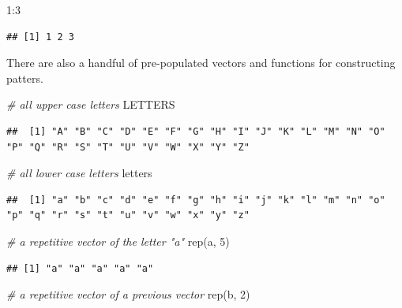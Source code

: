 \documentclass[
]{book}
\newenvironment{Shaded}{\begin{snugshade}}{\end{snugshade}}
\newcommand{\CommentTok}[1]{\textcolor[rgb]{0.56,0.35,0.01}{\textit{#1}}}
\newcommand{\DecValTok}[1]{\textcolor[rgb]{0.00,0.00,0.81}{#1}}
\newcommand{\FunctionTok}[1]{\textcolor[rgb]{0.00,0.00,0.00}{#1}}
\newcommand{\NormalTok}[1]{#1}
\newcommand{\SpecialCharTok}[1]{\textcolor[rgb]{0.00,0.00,0.00}{#1}}
\newcommand{\StringTok}[1]{\textcolor[rgb]{0.31,0.60,0.02}{#1}}
\begin{document}
\begin{Shaded}
\begin{Highlighting}[]
\DecValTok{1}\SpecialCharTok{:}\DecValTok{3}
\end{Highlighting}
\end{Shaded}

\begin{verbatim}
## [1] 1 2 3
\end{verbatim}

There are also a handful of pre-populated vectors and functions for constructing patters.

\begin{Shaded}
\begin{Highlighting}[]
\CommentTok{\# all upper case letters}
\NormalTok{LETTERS}
\end{Highlighting}
\end{Shaded}

\begin{verbatim}
##  [1] "A" "B" "C" "D" "E" "F" "G" "H" "I" "J" "K" "L" "M" "N" "O" "P" "Q" "R" "S" "T" "U" "V" "W" "X" "Y" "Z"
\end{verbatim}

\begin{Shaded}
\begin{Highlighting}[]
\CommentTok{\# all lower case letters}
\NormalTok{letters}
\end{Highlighting}
\end{Shaded}

\begin{verbatim}
##  [1] "a" "b" "c" "d" "e" "f" "g" "h" "i" "j" "k" "l" "m" "n" "o" "p" "q" "r" "s" "t" "u" "v" "w" "x" "y" "z"
\end{verbatim}

\begin{Shaded}
\begin{Highlighting}[]
\CommentTok{\# a repetitive vector of the letter "a"}
\FunctionTok{rep}\NormalTok{(}\StringTok{\textquotesingle{}a\textquotesingle{}}\NormalTok{, }\DecValTok{5}\NormalTok{)}
\end{Highlighting}
\end{Shaded}

\begin{verbatim}
## [1] "a" "a" "a" "a" "a"
\end{verbatim}

\begin{Shaded}
\begin{Highlighting}[]
\CommentTok{\# a repetitive vector of a previous vector}
\FunctionTok{rep}\NormalTok{(b, }\DecValTok{2}\NormalTok{)}
\end{Highlighting}
\end{Shaded}
\end{document}
